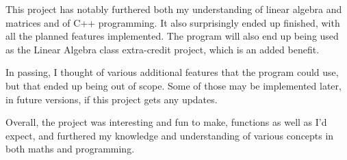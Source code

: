 \documentclass[11pt, a4paper]{article}
\begin{document}
This project has notably furthered both my understanding of linear algebra and matrices and of C++ programming.
It also surprisingly ended up finished, with all the planned features implemented.
The program will also end up being used as the Linear Algebra class extra-credit project, which is an added benefit.

In passing, I thought of various additional features that the program could use, but that ended up being out of scope.
Some of those may be implemented later, in future versions, if this project gets any updates.

Overall, the project was interesting and fun to make, functions as well as I'd expect, and furthered my knowledge and understanding of various concepts in both maths and programming.
\end{document}
